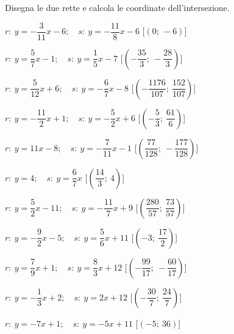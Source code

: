 \begin{esercizio}\label{ese:}
 Disegna le due rette e calcola le coordinate dell'intersezione.
 \begin{enumeratea}
  \item  \(r:~y = -\dfrac{3}{11} x -6;\quad s:~y = -\dfrac{11}{8} x -6\) 
\hfill    [\(\left(0;~-6\right)\)]
  \item  \(r:~y = \dfrac{5}{7} x -1;\quad s:~y = \dfrac{1}{5} x -7\) 
    \hfill    [\(\left(-\dfrac{35}{3};~-\dfrac{28}{3}\right)\)]
  \item  \(r:~y = \dfrac{5}{12} x +6;\quad s:~y = -\dfrac{6}{7} x -8\) 
    \hfill    [\(\left(-\dfrac{1176}{107};~\dfrac{152}{107}\right)\)]
  \item  \(r:~y = -\dfrac{11}{2} x +1;\quad s:~y = -\dfrac{5}{2} x +6\) 
\hfill    [\(\left(-\dfrac{5}{3};~\dfrac{61}{6}\right)\)]
  \item  \(r:~y = 11 x -8;\quad s:~y = -\dfrac{7}{11} x -1\) 
    \hfill    [\(\left(\dfrac{77}{128};~-\dfrac{177}{128}\right)\)]
  \item  \(r:~y = 4;\quad s:~y = \dfrac{6}{7} x \) \hfill 
   [\(\left(\dfrac{14}{3};~4\right)\)]
  \item  \(r:~y = \dfrac{5}{2} x -11;\quad s:~y = -\dfrac{11}{7} x +9\) 
\hfill    [\(\left(\dfrac{280}{57};~\dfrac{73}{57}\right)\)]
  \item  \(r:~y = -\dfrac{9}{2} x -5;\quad s:~y = \dfrac{5}{6} x +11\) 
    \hfill    [\(\left(-3;~\dfrac{17}{2}\right)\)]
  \item  \(r:~y = \dfrac{7}{9} x +1;\quad s:~y = \dfrac{8}{3} x +12\) 
    \hfill    [\(\left(-\dfrac{99}{17};~-\dfrac{60}{17}\right)\)]
  \item  \(r:~y = -\dfrac{1}{3} x +2;\quad s:~y = 2 x +12\) 
    \hfill    [\(\left(-\dfrac{30}{7};~\dfrac{24}{7}\right)\)]
  \item  \(r:~y = -7 x +1;\quad s:~y = -5 x +11\) 
    \hfill    [\(\left(-5;~36\right)\)]

\end{enumeratea}
\end{esercizio}
